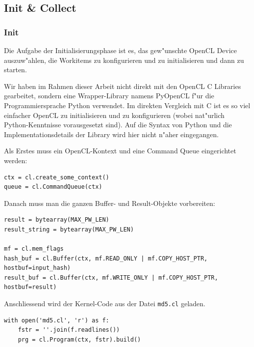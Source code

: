 \begin{refsection}
\subsection{Init \& Collect}

\subsubsection{Init}

Die Aufgabe der Initialisierungsphase ist es, das gew"unschte OpenCL Device
auszuw"ahlen, die Workitems zu konfigurieren und zu initialisieren und dann zu
starten.

Wir haben im Rahmen dieser Arbeit nicht direkt mit den OpenCL C Libraries
gearbeitet, sondern eine Wrapper-Library namens
PyOpenCL\cite{crypto:pyopencl_docs} f"ur die Programmiersprache
Python\cite{crypto:python} verwendet. Im direkten Vergleich mit C ist es so viel
einfacher OpenCL zu initialisieren und zu konfigurieren (wobei nat"urlich
Python-Kenntnisse vorausgesetzt sind). Auf die Syntax von Python und die
Implementationsdetails der Library wird hier nicht n"aher eingegangen.

Als Erstes muss ein OpenCL-Kontext und eine Command Queue eingerichtet werden:

\begin{small}
\begin{verbatim}
ctx = cl.create_some_context()
queue = cl.CommandQueue(ctx)
\end{verbatim}
\end{small}

\noindent Danach muss man die ganzen Buffer- und Result-Objekte vorbereiten:

\begin{small}
\begin{verbatim}
result = bytearray(MAX_PW_LEN)
result_string = bytearray(MAX_PW_LEN)

mf = cl.mem_flags
hash_buf = cl.Buffer(ctx, mf.READ_ONLY | mf.COPY_HOST_PTR, hostbuf=input_hash)
result_buf = cl.Buffer(ctx, mf.WRITE_ONLY | mf.COPY_HOST_PTR, hostbuf=result)
\end{verbatim}
\end{small}

\noindent Anschliessend wird der Kernel-Code aus der Datei \texttt{md5.cl}
geladen.

\begin{small}
\begin{verbatim}
with open('md5.cl', 'r') as f:
    fstr = ''.join(f.readlines())
    prg = cl.Program(ctx, fstr).build()
\end{verbatim}
\end{small}


\end{refsection}
